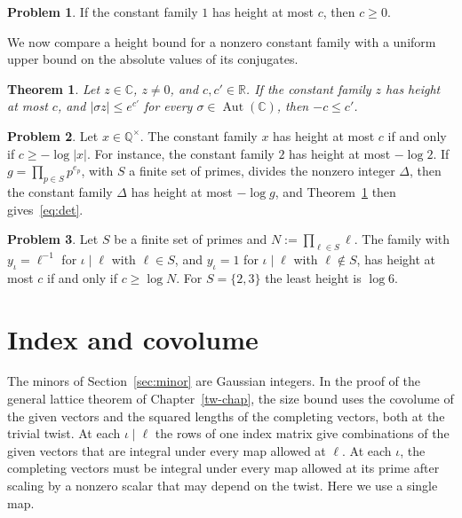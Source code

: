 \documentclass[reqno]{amsart}
\newcounter{chap}
\theoremstyle{definition}
\newtheorem{problem}{Problem}[section]
\theoremstyle{plain}
\newtheorem{theorem}{Theorem}[section]
\newcommand{\Q}{\mathbb{Q}}
\newcommand{\R}{\mathbb{R}}
\newcommand{\C}{\mathbb{C}}
\newcommand{\Aut}{\operatorname{Aut}}
\begin{document}
\begin{problem}\label{pr:one}
If the constant family \(1\) has height at most \(c\), then \(c \ge 0\).
\end{problem}

We now compare a height bound for a nonzero constant family with a uniform upper bound on the absolute values of its conjugates.

\begin{theorem}\label{thm:product}
Let \(z \in \C\), \(z \ne 0\), and \(c, c' \in \R\).  If the constant family \(z\) has height at most \(c\), and \(\lvert \sigma z \rvert \le e^{c'}\) for every \(\sigma \in \Aut(\C)\), then \(-c \le c'\).
\end{theorem}

\begin{problem}\label{pr:height-rational}
Let \(x \in \Q^\times\).  The constant family \(x\) has height at most \(c\) if and only if \(c \ge -\log \lvert x \rvert\).  For instance, the constant family \(2\) has height at most \(-\log 2\).  If \(g = \prod_{p \in S} p^{e_p}\), with \(S\) a finite set of primes, divides the nonzero integer \(\Delta\), then the constant family \(\Delta\) has height at most \(-\log g\), and Theorem~\ref{thm:product} then gives~\eqref{eq:det}.
\end{problem}

\begin{problem}\label{pr:reciprocal}
Let \(S\) be a finite set of primes and \(N := \prod_{\ell \in S} \ell\).  The family with \(y_\iota = \ell^{-1}\) for \(\iota \mid \ell\) with \(\ell \in S\), and \(y_\iota = 1\) for \(\iota \mid \ell\) with \(\ell \notin S\), has height at most \(c\) if and only if \(c \ge \log N\).  For \(S = \{2, 3\}\) the least height is \(\log 6\).
\end{problem}



\section{Index and covolume}\label{sec:index}

The minors of Section~\ref{sec:minor} are Gaussian integers.  In the proof of the general lattice theorem of Chapter~\ref{tw-chap}, the size bound uses the covolume of the given vectors and the squared lengths of the completing vectors, both at the trivial twist.  At each \(\iota \mid \ell\) the rows of one index matrix give combinations of the given vectors that are integral under every map allowed at \(\ell\).  At each \(\iota\), the completing vectors must be integral under every map allowed at its prime after scaling by a nonzero scalar that may depend on the twist.  Here we use a single map.
\end{document}

